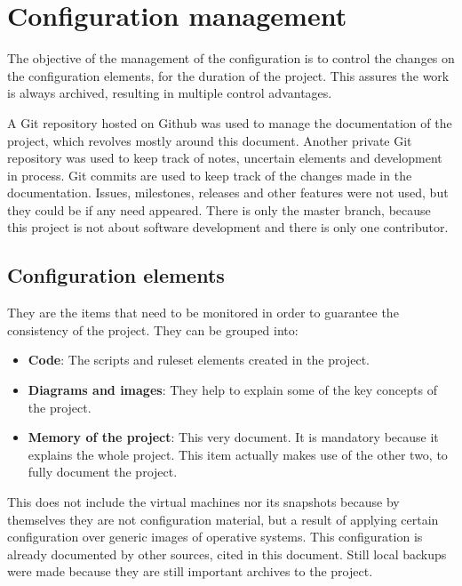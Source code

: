 \section{Configuration management}
The objective of the management of the configuration is to control the changes on the configuration elements, for the duration of the project. This assures the work is always archived, resulting in multiple control advantages.

\linej
\linej
A Git repository\cite{memoria_github} hosted on Github was used to manage the documentation of the project, which revolves mostly around this document.
Another private Git repository was used to keep track of notes, uncertain elements and development in process.
\linej
Git commits are used to keep track of the changes made in the documentation.
Issues, milestones, releases and other features were not used, but they could be if any need appeared.
There is only the master branch, because this project is not about software development and there is only one contributor.

\subsection{Configuration elements}
They are the items that need to be monitored in order to guarantee the consistency of the project.
They can be grouped into:
\begin{itemize}
	\item \textbf{Code}: The scripts and ruleset elements created in the project.
	\item \textbf{Diagrams and images}: They help to explain some of the key concepts of the project.
	\item \textbf{Memory of the project}: This very document. It is mandatory because it explains the whole project.
		This item actually makes use of the other two, to fully document the project.
\end{itemize}
\linej
This does not include the virtual machines nor its snapshots because by themselves they are not configuration material, but a result of applying certain configuration over generic images of operative systems. This configuration is already documented by other sources, cited in this document. Still local backups were made because they are still important archives to the project.
